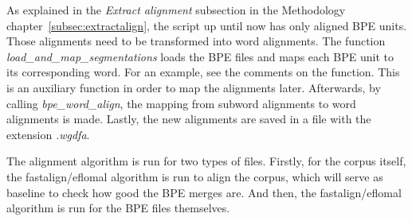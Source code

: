 As explained in the \textit{Extract alignment} subsection in the Methodology chapter~\ref{subsec:extractalign}, the script up until now has only aligned BPE units. Those alignments need to be transformed into word alignments. The function \emph{load\_and\_map\_segmentations} loads the BPE files and maps each BPE unit to its corresponding word. For an example, see the comments on the function. This is an auxiliary function in order to map the alignments later. Afterwards, by calling \emph{bpe\_word\_align}, the mapping from subword alignments to word alignments is made. Lastly, the new alignments are saved in a file with the extension \emph{.wgdfa}.

The alignment algorithm is run for two types of files. Firstly, for the corpus itself, the fastalign/eflomal algorithm is run to align the corpus, which will serve as baseline to check how good the BPE merges are. And then, the fastalign/eflomal algorithm is run for the BPE files themselves.

